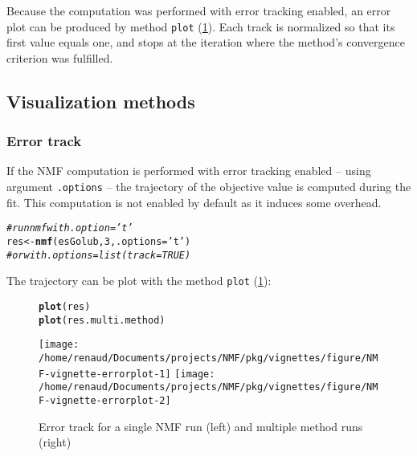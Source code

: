 \documentclass[a4paper]{article}\usepackage[]{graphicx}\usepackage[]{color}
\makeatletter
\newcommand{\hlnum}[1]{\textcolor[rgb]{0.686,0.059,0.569}{#1}}%
\newcommand{\hlstr}[1]{\textcolor[rgb]{0.192,0.494,0.8}{#1}}%
\newcommand{\hlcom}[1]{\textcolor[rgb]{0.678,0.584,0.686}{\textit{#1}}}%
\newcommand{\hlstd}[1]{\textcolor[rgb]{0.345,0.345,0.345}{#1}}%
\newcommand{\hlkwb}[1]{\textcolor[rgb]{0.69,0.353,0.396}{#1}}%
\newcommand{\hlkwc}[1]{\textcolor[rgb]{0.333,0.667,0.333}{#1}}%
\newcommand{\hlkwd}[1]{\textcolor[rgb]{0.737,0.353,0.396}{\textbf{#1}}}%
\newenvironment{kframe}{%
 \def\at@end@of@kframe{}%
 \ifinner\ifhmode%
  \def\at@end@of@kframe{\end{minipage}}%
  \begin{minipage}{\columnwidth}%
 \fi\fi%
 \def\FrameCommand##1{\hskip\@totalleftmargin \hskip-\fboxsep
 \colorbox{shadecolor}{##1}\hskip-\fboxsep
     \hskip-\linewidth \hskip-\@totalleftmargin \hskip\columnwidth}%
 \MakeFramed {\advance\hsize-\width
   \@totalleftmargin\z@ \linewidth\hsize
   \@setminipage}}%
 {\par\unskip\endMakeFramed%
 \at@end@of@kframe}
\newenvironment{knitrout}{}{} %
\let\code=\texttt
\makeatother
\begin{document}
Because the computation was performed with error tracking enabled, an error plot
can be produced by method \code{plot} (\cref{fig:errorplot}).
Each track is normalized so that its first value equals one, and stops at the iteration where the method's convergence criterion was fulfilled.

\subsection{Visualization methods}

\subsubsection*{Error track}

If the NMF computation is performed with error tracking enabled -- using argument \code{.options} -- the trajectory of the objective value is computed during the fit.
This computation is not enabled by default as it induces some overhead. 

\begin{knitrout}
\color{fgcolor}\begin{kframe}
\begin{alltt}
\hlcom{# run nmf with .option='t'}
\hlstd{res} \hlkwb{<-} \hlkwd{nmf}\hlstd{(esGolub,} \hlnum{3}\hlstd{,} \hlkwc{.options}\hlstd{=}\hlstr{'t'}\hlstd{)}
\hlcom{# or with .options=list(track=TRUE)}
\end{alltt}
\end{kframe}
\end{knitrout}

The trajectory can be plot with the method \code{plot} (\cref{fig:errorplot}):
\begin{figure}[!htbp]
\begin{knitrout}
\color{fgcolor}\begin{kframe}
\begin{alltt}
\hlkwd{plot}\hlstd{(res)}
\hlkwd{plot}\hlstd{(res.multi.method)}
\end{alltt}
\end{kframe}
\texttt{[image: /home/renaud/Documents/projects/NMF/pkg/vignettes/figure/NMF-vignette-errorplot-1]} 
\texttt{[image: /home/renaud/Documents/projects/NMF/pkg/vignettes/figure/NMF-vignette-errorplot-2]} 

\end{knitrout}
\caption{Error track for a single NMF run (left) and multiple method
runs (right)}
\label{fig:errorplot}
\end{figure}
\end{document}
